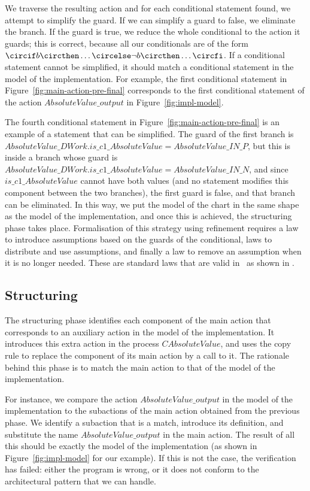 \documentclass[submission]{eptcs}
\begin{document}
We traverse the resulting action and for each conditional statement found, we attempt to simplify the guard. If we can simplify a guard to false, we eliminate the branch. If the guard is true, we reduce the whole conditional to the action it guards; this is correct, because all our conditionals are of the form $\circif b \circthen \ldots \circelse \lnot b \circthen \ldots \circfi$.
If a conditional statement cannot be simplified, it should match a conditional statement in the model of the implementation. For example, the first conditional statement in Figure~\ref{fig:main-action-pre-final} corresponds to the first conditional statement of the action $AbsoluteValue\_output$ in Figure~\ref{fig:impl-model}.\pagebreak

The fourth conditional statement in Figure~\ref{fig:main-action-pre-final} is an example of a statement that can be simplified. The guard of the first branch is $AbsoluteValue\_DWork.is\_c1\_AbsoluteValue = AbsoluteValue\_IN\_P$, but this is inside a branch whose guard is $AbsoluteValue\_DWork.is\_c1\_AbsoluteValue = AbsoluteValue\_IN\_N$, and since $is\_c1\_AbsoluteValue$ cannot have both values (and no statement modifies this component between the two branches), the first guard is false, and that branch can be eliminated. In this way, we put the model of the chart in the same shape as the model of the implementation, and once this is achieved, the structuring phase takes place. Formalisation of this strategy using refinement requires a law to introduce assumptions based on the guards of the conditional, laws to distribute and use assumptions, and finally a law to remove an assumption when it is no longer needed. These are standard laws that are valid in \Circus\ as shown in \cite{Oliveira2006a}.

\subsection{Structuring}

The structuring phase identifies each component of the main action that corresponds to an auxiliary action in the model of the implementation. It introduces this extra action in the process $CAbsoluteValue$, and uses the copy rule to replace the component of its main action by a call to it. The rationale behind this phase is to match the main action to that of the model of the implementation.

For instance, we compare the action $AbsoluteValue\_output$ in the model of the implementation to the subactions of the main action obtained from the previous phase.  We identify a subaction that is a match, introduce its definition, and substitute the name $AbsoluteValue\_output$ in the main action. The result of all this should be exactly the model of the implementation (as shown in Figure~\ref{fig:impl-model} for our example). If this is not the case, the verification has failed: either the program is wrong, or it does not conform to the architectural pattern that we can handle.
\end{document}
